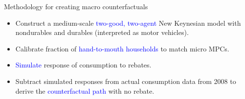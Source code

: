 \documentclass[english,xcolor=svgnames]{beamer}
\begin{document}
\begin{frame}{Methodology for creating macro counterfactuals}
\vspace{.1in}

  \begin{itemize}\itemsep=4ex
  \item Construct a medium-scale \textcolor{blue}{two-good, two-agent} New Keynesian model with nondurables and durables (interpreted as motor vehicles).
  \item Calibrate fraction of \textcolor{blue}{hand-to-mouth households} to match micro MPCs.
  \item \textcolor{blue}{Simulate} response of consumption to rebates.
  \item Subtract simulated responses from actual consumption data  from 2008 to derive the \textcolor{blue}{counterfactual path} with no rebate.
  \end{itemize}
\end{frame}
\end{document}
